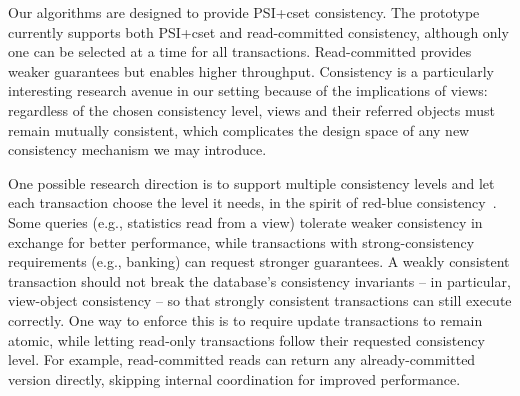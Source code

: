 Our algorithms are designed to provide PSI+cset consistency.
The prototype currently supports both PSI+cset and read-committed consistency, although only one can be selected at a time for all transactions.
Read-committed provides weaker guarantees but enables higher throughput.
Consistency is a particularly interesting research avenue in our setting because of the implications of views: regardless of the chosen consistency level, views and their referred objects must remain mutually consistent, which complicates the design space of any new consistency mechanism we may introduce.

One possible research direction is to support multiple consistency levels and let each transaction choose the level it needs, in the spirit of red-blue consistency~\cite{li2012making}.
Some queries (e.g., statistics read from a view) tolerate weaker consistency in exchange for better performance, while transactions with strong-consistency requirements (e.g., banking) can request stronger guarantees.
A weakly consistent transaction should not break the database's consistency invariants -- in particular, view-object consistency -- so that strongly consistent transactions can still execute correctly.
One way to enforce this is to require update transactions to remain atomic, while letting read-only transactions follow their requested consistency level.
For example, read-committed reads can return any already-committed version directly, skipping internal coordination for improved performance.



